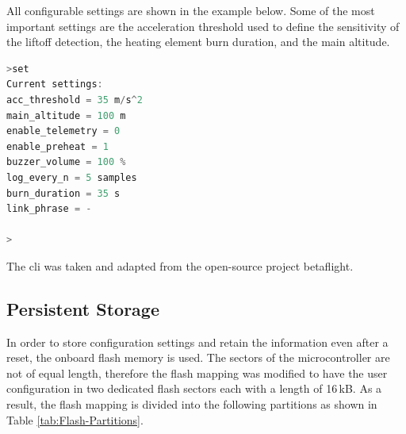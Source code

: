 All configurable settings are shown in the example below. Some of the most important settings are the acceleration threshold used to define the sensitivity of the liftoff detection, the heating element burn duration, and the main altitude. 

\bigskip
{}
\begin{lstlisting}[backgroundcolor=\color{gray!10},  
                   basicstyle=\ttfamily,
                   columns=fullflexible,
                   breakatwhitespace=false,      
                   breaklines=true,                
                   captionpos=b,                    
                   commentstyle=\color{mygreen}, 
                   extendedchars=true,              
                   frame=single,                   
                   keepspaces=true,             
                   keywordstyle=\color{blue},      
                   language=C,              
                   numbers=none,                
                   numbersep=5pt,                   
                   numberstyle=\color{blue}, 
                   rulecolor=\color{mygray},        
                   showspaces=false,
                   showstringspaces=false,
                   showtabs=false,                 
                   stepnumber=5,                  
                   stringstyle=\color{mymauve},    
                   tabsize=2,                      
                   title=\lstname,
                   frame=none,
                   xleftmargin = 1cm,
                   framexleftmargin = 1em]
>set
Current settings:
acc_threshold = 35 m/s^2
main_altitude = 100 m
enable_telemetry = 0
enable_preheat = 1
buzzer_volume = 100 %
log_every_n = 5 samples
burn_duration = 35 s
link_phrase = -

>
\end{lstlisting}

The \acrlong{cli} was taken and adapted from the open-source project \gls{betaflight}.

\newpage

\subsection{Persistent Storage}
In order to store configuration settings and retain the information even after a reset, the onboard flash memory is used. The sectors of the microcontroller are not of equal length, therefore the flash mapping was modified to have the user configuration in two dedicated flash sectors each with a length of 16\,kB. As a result, the flash mapping is divided into the following partitions as shown in Table \ref{tab:Flash-Partitions}.

